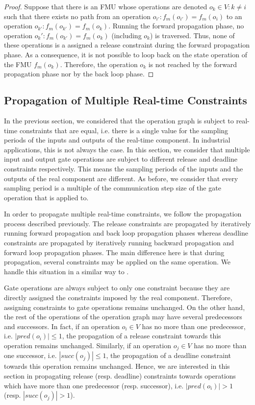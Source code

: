 \begin{proof}
Suppose that there is an FMU whose operations are denoted $o_k \in  V : k \neq i$ such that there exists no path from an operation $o_{i'}: f_m(o_{i'}) = f_m(o_{i})$ to an operation $o_{k'} : f_m(o_{k'}) = f_m(o_k)$. Running the forward propagation phase, no operation $o_k': f_m(o_{k'}) = f_m(o_k)$ (including $o_k$) is traversed. Thus, none of these operations is a assigned a release constraint during the forward propagation phase. As a consequence, it is not possible to loop back on the state operation of the FMU $f_m(o_{k})$. Therefore, the operation $o_k$ is not reached by the forward propagation phase nor by the back loop phase.
\end{proof}

\subsection{Propagation of Multiple Real-time Constraints}

In the previous section, we considered that the operation graph is subject to real-time constraints that are equal, i.e. there is a single value for the sampling periods of the inputs and outputs of the real-time component. In industrial applications, this is not always the case. In this section, we consider that multiple input and output gate operations are subject to different release and deadline constraints respectively. This means the sampling periods of the inputs and the outputs of the real component are different. As before, we consider that every sampling period is a multiple of the communication step size of the gate operation that is applied to.

In order to propagate multiple real-time constraints, we follow the propagation process described previously. The release constraints are propagated by iteratively running forward propagation and back loop propagation phases whereas deadline constraints are propagated by iteratively running backward propagation and forward loop propagation phases. The main difference here is that during propagation, several constraints may be applied on the same operation. We handle this situation in a similar way to \cite{faure:2011}.

Gate operations are always subject to only one constraint because they are directly assigned the constraints imposed by the real component. Therefore, assigning constraints to gate operations remains unchanged. On the other hand, the rest of the operations of the operation graph may have several predecessors and successors. In fact, if an operation $o_i \in V$ has no more than one predecessor, i.e. $|pred(o_i)| \leq 1$, the propagation of a release constraint towards this operation remains unchanged. Similarly, if an operation $o_j \in V$ has no more than one successor, i.e. $|succ(o_j)| \leq 1$, the propagation of a deadline constraint towards this operation remains unchanged. Hence, we are interested in this section in propagating release (resp. deadline) constraints towards operations which have more than one predecessor (resp. successor), i.e. $|pred(o_i)| > 1$ (resp. $|succ(o_j)| > 1$). 

